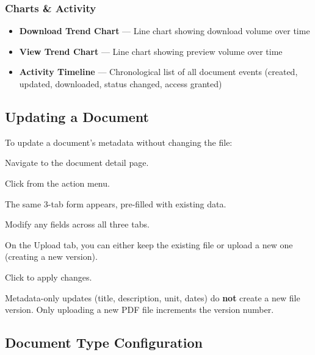 \subsubsection*{Charts \& Activity}

\begin{itemize}[leftmargin=18pt]
  \item \textbf{Download Trend Chart} --- Line chart showing
        download volume over time
  \item \textbf{View Trend Chart} --- Line chart showing
        preview volume over time
  \item \textbf{Activity Timeline} --- Chronological list of
        all document events (created, updated, downloaded,
        status changed, access granted)
\end{itemize}

\subsection{Updating a Document}

To update a document's metadata without changing the file:

\begin{ugSteps}
  \item Navigate to the document detail page.
  \item Click  from the action menu.
  \item The same 3-tab form appears, pre-filled with existing
        data.
  \item Modify any fields across all three tabs.
  \item On the Upload tab, you can either keep the existing
        file or upload a new one (creating a new version).
  \item Click  to apply changes.
\end{ugSteps}

\begin{ugNote}
  Metadata-only updates (title, description, unit, dates)
  do \textbf{not} create a new file version. Only uploading
  a new PDF file increments the version number.
\end{ugNote}

\subsection{Document Type Configuration}

